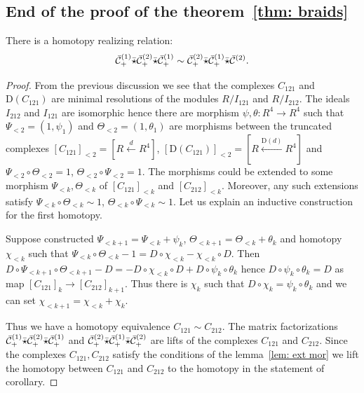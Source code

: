 \subsection{End of the proof of the theorem~\ref{thm: braids}}
\begin{corollary} \label{cor: cubic} There is a homotopy realizing relation:
$$ \bar{\mathcal{C}}^{(1)}_+\bar{\star}\bar{\mathcal{C}}^{(2)}_+\bar{\star}\bar{\mathcal{C}}^{(1)}_+\sim\bar{\mathcal{C}}_+^{(2)}\bar{\star}\bar{\mathcal{C}}_+^{(1)}\bar{\star}\bar{\mathcal{C}}^{(2)}.$$
\end{corollary}
\begin{proof}
  From the previous discussion we see that the complexes $C_{121}$ and $\mathrm{D}(C_{121})$ are minimal resolutions of the modules $R/I_{121}$ and $R/I_{212}$.
  The ideals \(I_{212}\) and \(I_{121}\) are isomorphic hence there are morphism \(\psi,\theta: R^4\rightarrow R^4\) such that
  \(\Psi_{<2}=(1,\psi_1)\) and \(\Theta_{<2}=(1,\theta_1)\) are morphisms between the truncated complexes \([C_{121}]_{<2}=[R\xleftarrow{d} R^4]\),
  \([\mathrm{D}(C_{121})]_{<2}=[R\xleftarrow{\mathrm{D}(d)} R^4]\) and \(\Psi_{<2}\circ \Theta_{<2}=1\), \(\Theta_{<2}\circ \Psi_{<2}=1\).
The morphisms could be extended to some morphism \(\Psi_{<k},\Theta_{<k}\) of \([C_{121}]_{<k}\) and \([C_{212}]_{<k}\).
Moreover, any such extensions satisfy \(\Psi_{<k}\circ \Theta_{<k}\sim 1\), \(\Theta_{<k}\circ \Psi_{<k}\sim 1\). Let us explain
an inductive construction for the first homotopy.

Suppose constructed \(\Psi_{<k+1}=\Psi_{<k}+\psi_k\),  \(\Theta_{<k+1}=\Theta_{<k}+\theta_k\) and homotopy \(\chi_{<k}\) such that \(\Psi_{<k}\circ \Theta_{<k}-1=D\circ \chi_{<k}-
\chi_{<k}\circ D\). Then \(D\circ \Psi_{<k+1}\circ\Theta_{<k+1}-D=-D\circ\chi_{<k}\circ D+D\circ \psi_k\circ \theta_k\) hence \(D\circ\psi_k\circ \theta_k=D\) as
map \([C_{121}]_k\to [C_{212}]_{k+1}\). Thus there is \(\chi_k\) such that \(D\circ\chi_k=\psi_k\circ\theta_k\) and we can set \(\chi_{<k+1}=\chi_{<k}+\chi_k\).

Thus we have a homotopy equivalence \(C_{121}\sim C_{212}\). The matrix factorizations
\(\bar{\mathcal{C}}_+^{(1)}\bar{\star}\bar{\mathcal{C}}_+^{(2)}\bar{\star}\bar{\mathcal{C}}^{(1)}_+\) and
\(\bar{\mathcal{C}}_+^{(2)}\bar{\star}\bar{\mathcal{C}}_+^{(1)}\bar{\star}\bar{\mathcal{C}}^{(2)}_+\)
are lifts of the complexes \(C_{121}\) and \(C_{212}\). Since the complexes \(C_{121},C_{212}\) satisfy the conditions of the lemma~\ref{lem: ext mor} we lift the homotopy
between \(C_{121}\) and \(C_{212}\) to the homotopy in the statement of corollary.
  
\end{proof}


